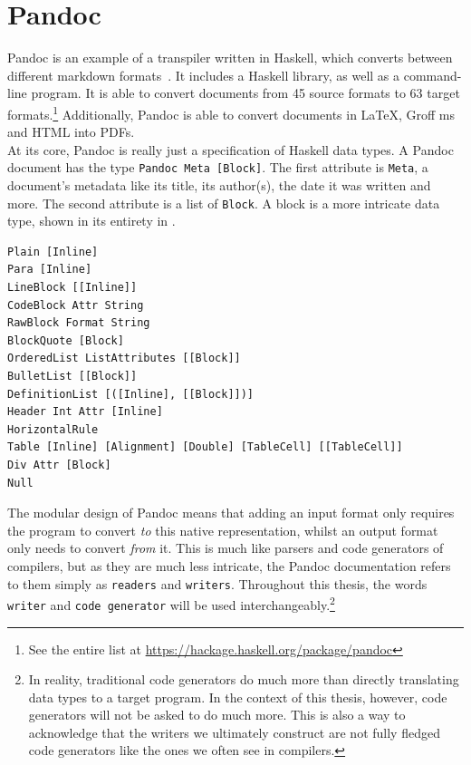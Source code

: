 

\section{Pandoc}

Pandoc is an example of a transpiler written in Haskell, which converts between different markdown formats~\cite{whatIsPandoc}. It includes a Haskell library, as well as a command-line program. It is able to convert documents from 45 source formats to 63 target formats.\footnote{See the entire list at \url{https://hackage.haskell.org/package/pandoc}} Additionally, Pandoc is able to convert documents in LaTeX, Groff ms and HTML into PDFs. \\

At its core, Pandoc is really just a specification of Haskell data types. A Pandoc document has the type \texttt{Pandoc Meta [Block]}. The first attribute is \texttt{Meta}, a document's metadata like its title, its author(s), the date it was written and more. The second attribute is a list of \texttt{Block}. A block is a more intricate data type, shown in its entirety in . \\

\begin{lstlisting}[caption={The \texttt{Block} data type of Pandocs native representation.}, captionpos=b, label={Block data type in Pandoc}]
Plain [Inline]
Para [Inline]
LineBlock [[Inline]]
CodeBlock Attr String
RawBlock Format String
BlockQuote [Block]
OrderedList ListAttributes [[Block]]
BulletList [[Block]]
DefinitionList [([Inline], [[Block]])]
Header Int Attr [Inline]
HorizontalRule
Table [Inline] [Alignment] [Double] [TableCell] [[TableCell]]
Div Attr [Block]
Null
\end{lstlisting}

The modular design of Pandoc means that adding an input format only requires the program to convert \textit{to} this native representation, whilst an output format only needs to convert \textit{from} it. This is much like parsers and code generators of compilers, but as they are much less intricate, the Pandoc documentation refers to them simply as \texttt{readers} and \texttt{writers}. Throughout this thesis, the words \texttt{writer} and \texttt{code generator} will be used interchangeably.\footnote{In reality, traditional code generators do much more than directly translating data types to a target program. In the context of this thesis, however, code generators will not be asked to do much more. This is also a way to acknowledge that the writers we ultimately construct are not fully fledged code generators like the ones we often see in compilers.} \\

